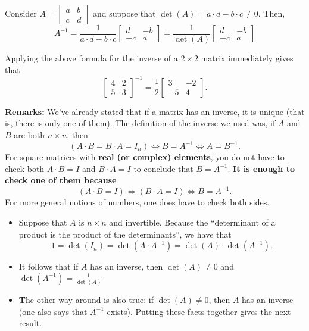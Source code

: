 \begin{tcolorbox}[sharp corners, colback=green!30, colframe=green!80!blue, title=\textbf{\large Most Important Matrix Inverse for ROB 101}]
 {\large Consider $A=\left[\begin{array}{rr} a & b \\ c & d\end{array} \right]$ and suppose that $\det(A) = a\cdot d - b \cdot c \neq 0.$ Then,
  $$ A^{-1}= \frac{1}{a\cdot d - b \cdot c} \left[\begin{array}{rr} d & -b \\ -c & a\end{array} \right] = \frac{1}{\det(A)} \left[\begin{array}{rr} d & -b \\ -c & a\end{array} \right] $$}
\end{tcolorbox}

Applying the above formula for the inverse of a $2 \times 2$ matrix immediately gives that
 $$\left[\begin{array}{rr} 4 & 2 \\ 5 & 3\end{array} \right]^{-1} = \frac{1}{2}\left[\begin{array}{rr} 3 & -2\\ -5 & 4 \end{array} \right].$$

\textbf{Remarks:} We've already stated that if a matrix has an inverse, it is unique (that is, there is only one of them). The definition of the inverse we used was, if $A$ and $B$ are both $n \times n$, then 
$$(A \cdot B=B \cdot A = I_n) \iff B=A^{-1} \iff A = B^{-1}.$$
For square matrices with \textbf{real (or complex) elements}, you do not have to check both $A \cdot B = I$ and $ B \cdot A = I$ to conclude that $B=A^{-1}$. \textbf{It is enough to check one of them because}
  $$(A \cdot B = I) \iff (B\cdot A= I) \iff B=A^{-1}. $$
  For more general notions of numbers, one does have to check both sides. \\


\begin{tcolorbox}[title=\textbf{The Matrix Inverse and the Matrix Determinant:}]

\begin{itemize}
    \item Suppose that $A$ is $n \times n$ and invertible. Because the ``determinant of a product is the product of the determinants'', we have that
    $$1 = \det(I_n)=  \det(A\cdot A^{-1})=\det(A) \cdot \det(A^{-1}). $$
    \item It follows that if $A$ has an inverse, then $\det(A)\neq 0$ and 
    $\det(A^{-1}) = \frac{1}{\det(A)}$
    \item {\textbf The other way around is also true:} if $\det(A)\neq 0$, then $A$ has an inverse (one also says that $A^{-1}$ exists). Putting these facts together gives the next result.
\end{itemize}
\end{tcolorbox}
\vspace*{1cm}


